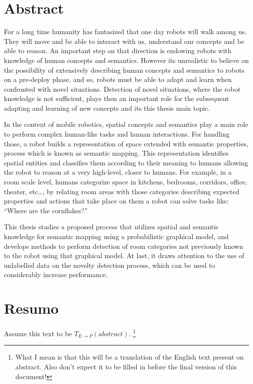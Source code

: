 \chapter*{Abstract}
For a long time humanity has fantasized that one day robots will walk among us.
They will move and be able to interact with us, understand our concepts and
be able to reason.
An important step on that direction is endowing robots with knowledge of human concepts and
semantics. However its unrealistic to believe on the possibility of extensively
describing human concepts and semantics to robots on a pre-deploy phase, and so, robots must be able
to adapt and learn when confronted with novel situations.
Detection of novel situations, where the robot knowledge is not sufficient, plays then an important
role for the subsequent adapting and learning of new concepts and its this thesis main topic.

In the context of mobile robotics, spatial concepts and semantics play a main role to perform
complex human-like tasks and human interactions. For handling those, a robot builds a representation
of space extended with semantic properties, process which is known as semantic mapping.
This representation identifies spatial entities and classifies them according to their meaning to
humans allowing the robot to reason at a very high-level, closer to humans.
For example, in a room scale level, humans categorize space in kitchens, bedrooms, corridors,
office, theater, etc\dots, by relating room areas with those categories describing expected
properties and actions that take place on them a robot can solve tasks like:
``Where are the cornflakes?''

This thesis studies a proposed %
process that utilizes spatial and semantic knowledge for semantic mapping using a
probabilistic graphical model,
and develops methods to perform detection of room categories not previously
known to the robot using that graphical model.
At last, it draws attention to the use of unlabelled data on the novelty detection process,
which can be used to considerably increase performance.


\chapter*{Resumo}
Assume this text to be $T_{E \rightarrow P}(abstract)$.
\footnote{What I mean is that this will be a translation of the English text
present on abstract. Also don't expect it to be filled in before the final
version of this document!}


